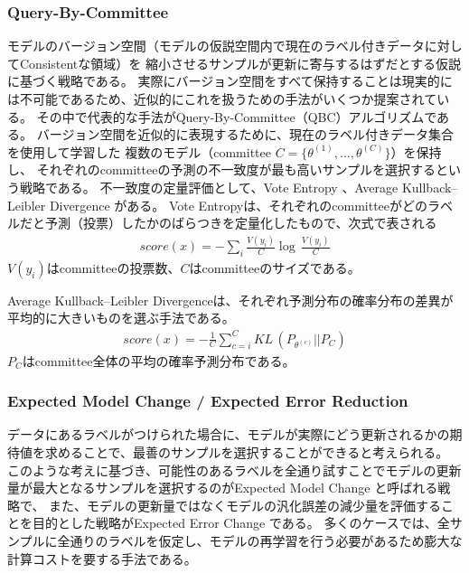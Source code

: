 \subsubsection{Query-By-Committee \cite{seung1992query}}
モデルのバージョン空間（モデルの仮説空間内で現在のラベル付きデータに対してConsistentな領域）を
縮小させるサンプルが更新に寄与するはずだとする仮説に基づく戦略である。
実際にバージョン空間をすべて保持することは現実的には不可能であるため、近似的にこれを扱うための手法がいくつか提案されている。
その中で代表的な手法がQuery-By-Committee（QBC）アルゴリズム\cite{seung1992query}である。
バージョン空間を近似的に表現するために、現在のラベル付きデータ集合を使用して学習した
複数のモデル（committee $C=\{ \theta^{(1)}, \dots, \theta^{(C)}\}$）を保持し、
それぞれのcommitteeの予測の不一致度が最も高いサンプルを選択するという戦略である。
不一致度の定量評価として、Vote Entropy \cite{dagan1995committee}、Average Kullback–Leibler Divergence \cite{mccallum1998employing}がある。
Vote Entropyは、それぞれのcommitteeがどのラベルだと予測（投票）したかのばらつきを定量化したもので、次式で表される
\begin{eqnarray}
    score(x) =  - \sum_i \frac{V(y_i)}{C} \log \, \frac{V(y_i)}{C}
\end{eqnarray}
$V(y_i)$はcommitteeの投票数、$C$はcommitteeのサイズである。

Average Kullback–Leibler Divergenceは、それぞれ予測分布の確率分布の差異が平均的に大きいものを選ぶ手法である。
\begin{eqnarray}
    score(x) =  -  \frac{1}{C} \sum_{c=i}^C KL \, (P_{\theta^{(c)}} || P_C)
\end{eqnarray}
$P_C$はcommittee全体の平均の確率予測分布である。

\subsubsection{Expected Model Change \cite{settles2008multiple} / Expected Error Reduction \cite{roy2001toward}}
データにあるラベルがつけられた場合に、モデルが実際にどう更新されるかの期待値を求めることで、最善のサンプルを選択することができると考えられる。
このような考えに基づき、可能性のあるラベルを全通り試すことでモデルの更新量が最大となるサンプルを選択するのがExpected Model Change \cite{settles2008multiple}と呼ばれる戦略で、
また、モデルの更新量ではなくモデルの汎化誤差の減少量を評価することを目的とした戦略がExpected Error Change \cite{roy2001toward}である。
多くのケースでは、全サンプルに全通りのラベルを仮定し、モデルの再学習を行う必要があるため膨大な計算コストを要する手法である。

